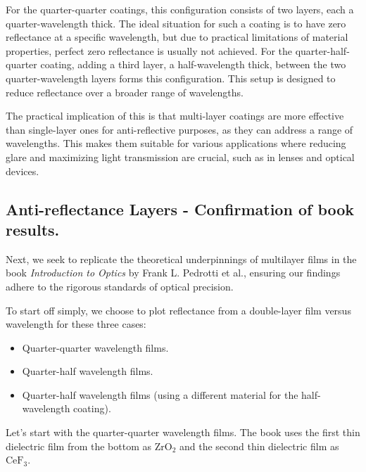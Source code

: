 

For the quarter-quarter coatings, this configuration consists of two layers, each a quarter-wavelength thick. The ideal situation for such a coating is to have zero reflectance at a specific wavelength, but due to practical limitations of material properties, perfect zero reflectance is usually not achieved. For the quarter-half-quarter coating, adding a third layer, a half-wavelength thick, between the two quarter-wavelength layers forms this configuration. This setup is designed to reduce reflectance over a broader range of wavelengths.

The practical implication of this is that multi-layer coatings are more effective than single-layer ones for anti-reflective purposes, as they can address a range of wavelengths. This makes them suitable for various applications where reducing glare and maximizing light transmission are crucial, such as in lenses and optical devices.


\subsection{Anti-reflectance Layers - Confirmation of book results.}

Next, we seek to replicate the theoretical underpinnings of multilayer films in the book \emph{Introduction to Optics} by Frank L. Pedrotti et al., ensuring our findings adhere to the rigorous standards of optical precision.

To start off simply, we choose to plot reflectance from a double-layer film versus wavelength for these three cases:
\begin{itemize}
    \item Quarter-quarter wavelength films.
    \item Quarter-half wavelength films.
    \item Quarter-half wavelength films (using a different material for the half-wavelength coating).
\end{itemize}

Let's start with the quarter-quarter wavelength films. The book uses the first thin dielectric film from the bottom as $\text{ZrO}_2$ and the second thin dielectric film as $\text{CeF}_3$.

